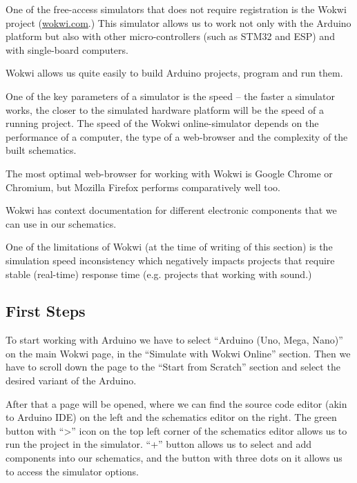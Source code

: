 \documentclass[../sparc.tex]{subfiles}
\begin{document}
One of the free-access simulators that does not require registration is the
Wokwi project (\href{https://wokwi.com/}{wokwi.com}.)  This simulator allows us
to work not only with the Arduino platform but also with other micro-controllers
(such as STM32 and ESP) and with single-board computers.

Wokwi allows us quite easily to build Arduino projects, program and run them.

One of the key parameters of a simulator is the speed -- the faster a simulator
works, the closer to the simulated hardware platform will be the speed of a
running project.  The speed of the Wokwi online-simulator depends on the
performance of a computer, the type of a web-browser and the complexity of the
built schematics.

The most optimal web-browser for working with Wokwi is Google Chrome or
Chromium, but Mozilla Firefox performs comparatively well too.

Wokwi has context documentation for different electronic components that we can
use in our schematics.

One of the limitations of Wokwi (at the time of writing of this section) is the
simulation speed inconsistency which negatively impacts projects that require
stable (real-time) response time (e.g. projects that working with sound.)

\subsection{First Steps}

To start working with Arduino we have to select ``Arduino (Uno, Mega, Nano)'' on
the main Wokwi page, in the ``Simulate with Wokwi Online'' section.  Then we
have to scroll down the page to the ``Start from Scratch'' section and select
the desired variant of the Arduino.

After that a page will be opened, where we can find the source code editor (akin
to Arduino IDE) on the left and the schematics editor on the right.  The green
button with ``>'' icon on the top left corner of the schematics editor allows us
to run the project in the simulator.  ``+'' button allows us to select and add
components into our schematics, and the button with three dots on it allows us
to access the simulator options.
\end{document}
